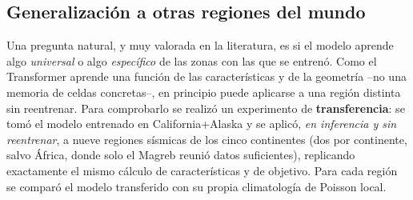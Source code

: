 \subsection{Generalización a otras regiones del mundo}
\label{res-transferencia}

Una pregunta natural, y muy valorada en la literatura, es si el modelo aprende algo
\emph{universal} o algo \emph{específico} de las zonas con las que se entrenó. Como el
Transformer aprende una función de las características y de la geometría --no una memoria de
celdas concretas--, en principio puede aplicarse a una región distinta sin reentrenar. Para
comprobarlo se realizó un experimento de \textbf{transferencia}: se tomó el modelo entrenado en
California+Alaska y se aplicó, \emph{en inferencia y sin reentrenar}, a nueve regiones sísmicas
de los cinco continentes (dos por continente, salvo África, donde solo el Magreb reunió datos
suficientes), replicando exactamente el mismo cálculo de características y de objetivo. Para cada
región se comparó el modelo transferido con su propia climatología de Poisson local.

